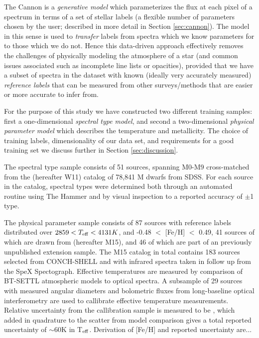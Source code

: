 \documentclass[modern]{aastex62}
\begin{document}
The Cannon is a \emph{generative model} which parameterizes the flux at each pixel of a spectrum in terms of a set of stellar labels (a flexible number of parameters chosen by the user; described in more detail in Section \ref{sec:cannon}). The model in this sense is used to \emph{transfer} labels from spectra which we know parameters for to those which we do not. Hence this data-driven approach effectively removes the challenges of physically modeling the atmosphere of a star (and common issues associated such as incomplete line lists or opacities), provided that we have a subset of spectra in the dataset with known (ideally very accurately measured) \emph{reference labels} that can be measured from other surveys/methods that are easier or more accurate to infer from. 

For the purpose of this study we have constructed two different training samples: first a one-dimensional \emph{spectral type model}, and second a two-dimensional \emph{physical parameter model} which describes the temperature and metallicity. The choice of training labels, dimensionality of our data set, and requirements for a good training set we discuss further in Section \ref{sec:discussion}.

The spectral type sample consists of 51 sources, spanning M0-M9 cross-matched from the \citealt{West:2011} (hereafter W11) catalog of 78,841 M dwarfs from SDSS. For each source in the catalog, spectral types were determined both through an automated routine using The Hammer \citep{Covey:2007} and by visual inspection to a reported accuracy of $\pm$1 type.

The physical parameter sample consists of 87 sources with reference labels distributed over $2859 < T_{\rm eff} < 4131K$, and -0.48 $<$ [Fe/H] $<$ 0.49, 41 sources of which are drawn from \citealt{Mann:2015} (hereafter M15), and 46 of which are part of an previously unpublished extension sample. The M15 catalog in total contains 183 sources selected from CONCH-SHELL \citep{Gaidos:2013} and with infrared spectra taken in follow up from the SpeX Spectograph. Effective temperatures are measured by comparison of BT-SETTL atmospheric models \citep{Allard:2011} to optical spectra. A subsample of 29 sources with measured angular diameters and bolometric fluxes from long-baseline optical interferometry are used to callibrate effective temperature measurements. Relative uncertainty from the callibration sample is measured to be \color{red}{$\sim$30K (check this)}\color{black}, which added in quadrature to the scatter from model comparison gives a total reported uncertainty of $\sim$60K in T$_{\rm eff}$. Derivation of [Fe/H] and reported uncertainty are...
\end{document}
